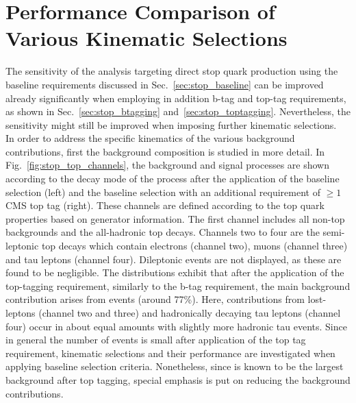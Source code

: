 \section{Performance Comparison of Various Kinematic Selections}
\label{sec:stop_cuts}
The sensitivity of the analysis targeting direct stop quark production using the baseline requirements discussed in Sec.~\ref{sec:stop_baseline} can be improved already significantly when employing in addition b-tag and top-tag requirements, as shown in Sec.~\ref{sec:stop_btagging} and~\ref{sec:stop_toptagging}. Nevertheless, the sensitivity might still be improved when imposing further kinematic selections. \\
In order to address the specific kinematics of the various background contributions, first the background composition is studied in more detail. In Fig.~\ref{fig:stop_top_channels}, the background and signal processes are shown according to the decay mode of the process after the application of the baseline selection (left) and the baseline selection with an additional requirement of $\ge 1$ CMS top tag (right). These channels are defined according to the top quark properties based on generator information. The first channel includes all non-top backgrounds and the all-hadronic top decays. Channels two to four are the semi-leptonic top decays which contain electrons (channel two), muons (channel three) and tau leptons (channel four). Dileptonic \ttbar events are not displayed, as these are found to be negligible. The distributions exhibit that after the application of the top-tagging requirement, similarly to the b-tag requirement, the main background contribution arises from \ttbar events (around 77\%). Here, contributions from lost-leptons (channel two and three) and hadronically decaying tau leptons (channel four) occur in about equal amounts with slightly more hadronic tau events. Since in general the number of events is small after application of the top tag requirement, kinematic selections and their performance are investigated when applying baseline selection criteria. Nonetheless, since \ttbar is known to be the largest background after top tagging, special emphasis is put on reducing the \ttbar background contributions.
